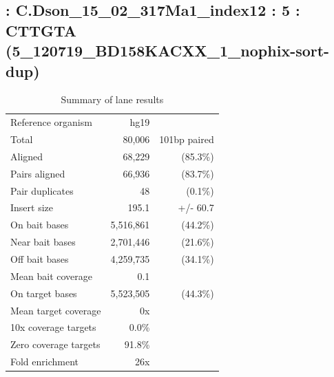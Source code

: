 \documentclass{article}
\begin{document}
    
\subsection*{ : C.Dson\_15\_02\_317Ma1\_index12 : 5 : CTTGTA (5\_120719\_BD158KACXX\_1\_nophix-sort-dup)}

    \begin{table}[h]
    \centering
    \begin{tabular}{|l|rr|}
    \hline
            Reference organism & hg19 &  \\ 
            Total & 80,006 & 101bp paired \\ 
            Aligned & 68,229 & (85.3\%) \\ 
            Pairs aligned & 66,936 & (83.7\%) \\ 
            Pair duplicates & 48 & (0.1\%) \\ 
            Insert size & 195.1 & +/- 60.7 \\ 
            \hline
            On bait bases & 5,516,861 & (44.2\%) \\ 
            Near bait bases & 2,701,446 & (21.6\%) \\ 
            Off bait bases & 4,259,735 & (34.1\%) \\ 
            Mean bait coverage & 0.1 &  \\ 
            On target bases & 5,523,505 & (44.3\%) \\ 
            Mean target coverage & 0x &  \\ 
            10x coverage targets & 0.0\% &  \\ 
            Zero coverage targets & 91.8\% &  \\ 
            Fold enrichment & 26x &  \\ 
    \hline
    \end{tabular}
    \caption{Summary of lane results}
    \end{table}
\end{document}
